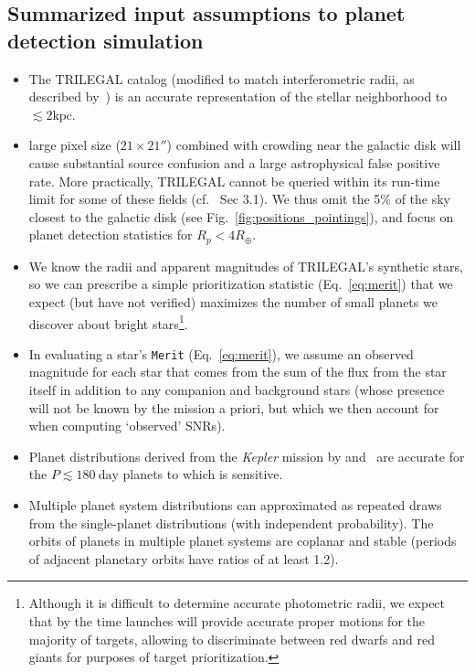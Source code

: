 \subsection{Summarized input assumptions to planet detection simulation}
\label{sec:input_assumptions}
\begin{itemize}
	\item The TRILEGAL catalog (modified to match interferometric radii, as described by~) is an accurate representation of the stellar neighborhood to $\lesssim2\text{kpc}$.
	\item \tesss large pixel size ($21\times21''$) combined with crowding near the galactic disk will cause substantial source confusion and a large astrophysical false positive rate. 
	More practically, TRILEGAL cannot be queried within its run-time limit for some of these fields (cf.~ Sec 3.1).
	We thus omit the 5\% of the sky closest to the galactic disk (see Fig.~\ref{fig:positions_pointings}), and focus on planet detection statistics for $R_p < 4R_\oplus$.
	\item We know the radii and apparent magnitudes of TRILEGAL's synthetic stars, so we can prescribe a simple prioritization statistic (Eq.~\ref{eq:merit}) that we expect (but have not verified) maximizes the number of small planets we discover about bright stars\footnote{Although it is difficult to determine accurate photometric radii, we expect that by the time \tess launches \gaia will  provide accurate proper motions for the majority of \tess targets, allowing \tess to discriminate between red dwarfs and red giants for purposes of target prioritization.}.
	\item In evaluating a star's \texttt{Merit} (Eq.~\ref{eq:merit}), we assume an observed magnitude for each star that comes from the sum of the flux from the star itself in addition to any companion and background stars (whose presence will not be known by the mission a priori, but which we then account for when computing `observed' SNRs).
	\item Planet distributions derived from the \textit{Kepler} mission by \citet{fressin_false_2013} and~\citet{dressing_occurrence_2015} are accurate for the $P \lesssim 180\ \text{day}$ planets to which \tess is sensitive.
	\item Multiple planet system distributions can approximated as repeated draws from the single-planet distributions (with independent probability). The orbits of planets in multiple planet systems are coplanar and stable (periods of adjacent planetary orbits have ratios of at least 1.2).

\end{itemize}
